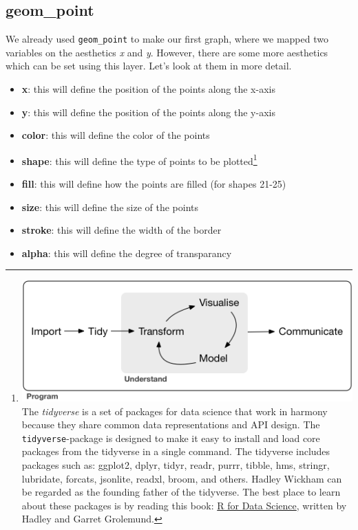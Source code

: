 \documentclass[]{tufte-book}
\providecommand{\tightlist}{%
  \setlength{\itemsep}{0pt}\setlength{\parskip}{0pt}}
\begin{document}
\hypertarget{geom_point}{%
\subsection{geom\_point}\label{geom_point}}

We already used \texttt{geom\_point} to make our first graph, where we mapped two variables on the aesthetics \emph{x} and \emph{y}. However, there are some more aesthetics which can be set using this layer. Let's look at them in more detail.

\begin{itemize}
\tightlist
\item
  \textbf{x}: this will define the position of the points along the x-axis
\item
  \textbf{y}: this will define the position of the points along the y-axis
\item
  \textbf{color}: this will define the color of the points
\item
  \textbf{shape}: this will define the type of points to be plotted\footnote{\includegraphics{images/tidyverse.png} The \emph{tidyverse} is a set of packages for data science that work in harmony because they share common data representations and API design. The \texttt{tidyverse}-package is designed to make it easy to install and load core packages from the tidyverse in a single command. The tidyverse includes packages such as: ggplot2, dplyr, tidyr, readr, purrr, tibble, hms, stringr, lubridate, forcats, jsonlite, readxl, broom, and others. Hadley Wickham can be regarded as the founding father of the tidyverse. The best place to learn about these packages is by reading this book: \href{http://r4ds.had.co.nz/}{R for Data Science}, written by Hadley and Garret Grolemund.}
\item
  \textbf{fill}: this will define how the points are filled (for shapes 21-25)
\item
  \textbf{size}: this will define the size of the points
\item
  \textbf{stroke}: this will define the width of the border
\item
  \textbf{alpha}: this will define the degree of transparancy
\end{itemize}
\end{document}
